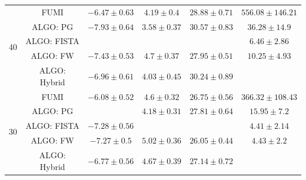 \begin{table}[h]
{\begin{threeparttable}
\begin{tabular}{|c|c|c|c|c|c|}
\multirow{5}{*}{40} & FUMI                   &                    {$-6.47\pm 0.63$} &                    {$4.19\pm 0.4$}  &                    {$28.88\pm 0.71$} &                    {$556.08\pm 146.21$} \tabularnewline
                    & ALGO: PG               &                    {$-7.93\pm 0.64$} &                    {$3.58\pm 0.37$} &                    {$30.57\pm 0.83$} &                    {$36.28\pm 14.9$}    \tabularnewline
                    & ALGO: FISTA            & \cellcolor{red! 10}{$-7.94\pm 0.67$} & \cellcolor{red! 10}{$3.07\pm 0.54$} & \cellcolor{red! 10}{$32.22\pm 1.55$} &                    {$6.46\pm 2.86$}     \tabularnewline
                    & ALGO: FW               &                    {$-7.43\pm 0.53$} &                    {$4.7\pm 0.37$}  &                    {$27.95\pm 0.51$} &                    {$10.25\pm 4.93$}    \tabularnewline
                    & ALGO: Hybrid \tnote{1} &                    {$-6.96\pm 0.61$} &                    {$4.03\pm 0.45$} &                    {$30.24\pm 0.89$} & \cellcolor{red! 10}{$5.7\pm 1.43$}      \tabularnewline \hline \hline
\multirow{5}{*}{30} & FUMI                   &                    {$-6.08\pm 0.52$} &                    {$4.6\pm 0.32$}  &                    {$26.75\pm 0.56$} &                    {$366.32\pm 108.43$} \tabularnewline
                    & ALGO: PG               & \cellcolor{red! 10}{$-7.61\pm 0.54$} &                    {$4.18\pm 0.31$} &                    {$27.81\pm 0.64$} &                    {$15.95\pm 7.2$}     \tabularnewline
                    & ALGO: FISTA            &                    {$-7.28\pm 0.56$} & \cellcolor{red! 10}{$3.93\pm 0.48$} & \cellcolor{red! 10}{$28.49\pm 1.17$} &                    {$4.41\pm 2.14$}     \tabularnewline
                    & ALGO: FW               &                    {$-7.27\pm 0.5$}  &                    {$5.02\pm 0.36$} &                    {$26.05\pm 0.44$} &                    {$4.43\pm 2.2$}      \tabularnewline
                    & ALGO: Hybrid \tnote{1} &                    {$-6.77\pm 0.56$} &                    {$4.67\pm 0.39$} &                    {$27.14\pm 0.72$} & \cellcolor{red! 10}{$2.82\pm 0.78$}     \tabularnewline \hline \hline

\end{tabular}
\end{threeparttable}}
\end{table}
